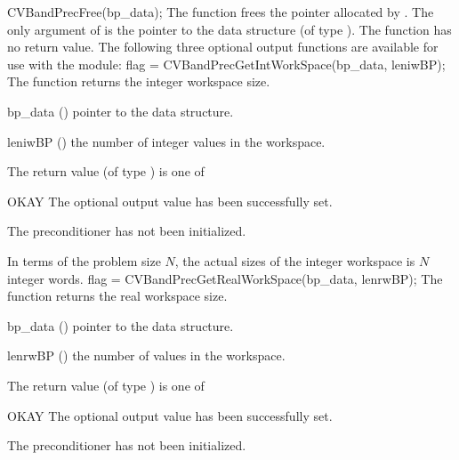 {}
{
  CVBandPrecFree(bp\_data);
}
{
  The function  frees the pointer allocated by
  .
}
{
  The only argument of  is the pointer to the {\cvbandpre} 
  data structure (of type ).
}
{
  The function  has no return value.
}
{}
The following three optional output functions are available for use with 
the {\cvbandpre} module:
{
  flag = CVBandPrecGetIntWorkSpace(bp\_data, leniwBP);
}
{
  The function  returns the
  {\cvbandpre} integer workspace size.
}
{
  \begin{args}[leniwBP]
  \item[bp\_data] ()
    pointer to the {\cvbandpre} data structure.
  \item[leniwBP] ()
    the number of integer values in the {\cvbandpre} workspace.
  \end{args}
}
{
  The return value  (of type ) is one of
  \begin{args}[BP\_NO\_DATA]
  \item[OKAY] 
    The optional output value has been successfully set.
  \item[\Id{BP\_NO\_DATA}]
    The {\cvbandpre} preconditioner has not been initialized.
  \end{args}
}
{
  In terms of the problem size $N$, the actual sizes of the integer workspace
  is $N$ integer words.
}
{
  flag = CVBandPrecGetRealWorkSpace(bp\_data, lenrwBP);
}
{
  The function  returns the
  {\cvbandpre} real workspace size.
}
{
  \begin{args}[lenrwBP]
  \item[bp\_data] ()
    pointer to the {\cvbandpre} data structure.
  \item[lenrwBP] ()
    the number of  values in the {\cvbandpre} workspace.
  \end{args}
}
{
  The return value  (of type ) is one of
  \begin{args}[BP\_NO\_DATA]
  \item[OKAY] 
    The optional output value has been successfully set.
  \item[\Id{BP\_NO\_DATA}]
    The {\cvbandpre} preconditioner has not been initialized.
  \end{args}
}
